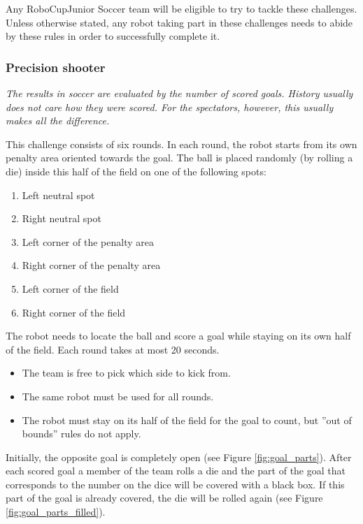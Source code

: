 \documentclass{article}
\begin{document}
Any RoboCupJunior Soccer team will be eligible to try to tackle these
challenges. Unless otherwise stated, any robot taking part in these
challenges needs to abide by these rules in order to successfully complete it.

\subsubsection{Precision shooter}

\textit{The results in soccer are evaluated by the number of
scored goals. History usually does not care how they were scored. For
the spectators, however, this usually makes all the difference.}

This challenge consists of six rounds. In each round, the robot
starts from its own penalty area oriented towards the goal. The ball is
placed randomly (by rolling a die) inside this half of the field on one of
the following spots:

\begin{enumerate}
    \item Left neutral spot
    \item Right neutral spot
    \item Left corner of the penalty area
    \item Right corner of the penalty area
    \item Left corner of the field
    \item Right corner of the field
\end{enumerate}

The robot needs to locate the ball and score a goal while
staying on its own half of the field. Each round takes at most 20 seconds.

\begin{itemize}
    \item The team is free to pick which side to kick from.
    \item The same robot must  be used for all rounds.
    \item The robot must stay on its half of the field for the
            goal to count, but ''out of bounds'' rules do not apply.
\end{itemize}

Initially, the opposite goal is completely open (see Figure
\ref{fig:goal_parts}). After each
scored goal a member of the team rolls a die and the part of the goal that
corresponds to the number on the dice will be covered with a black box. If
this part of the goal is already covered, the die will be rolled again (see
Figure \ref{fig:goal_parts_filled}).
\end{document}
